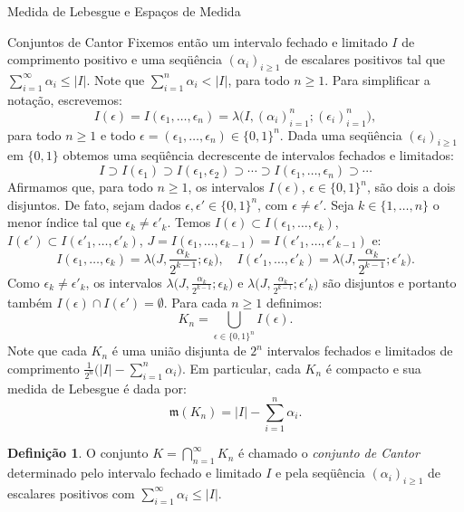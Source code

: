 \documentclass[oneside,final,11pt]{amsbook}
\newcommand{\leb}{\mathfrak m}
\theoremstyle{remark}\newtheorem{exercise}{Exercício}[chapter]
\theoremstyle{remark}\newtheorem{*exercise}[exercise]{\hbox to 0pt{\hskip 0pt minus 1fil*}Exercício}
\theoremstyle{definition}\newtheorem{exdefin}{Definição}[chapter]
\theoremstyle{plain}\newtheorem{teo}{Teorema}[section]
\theoremstyle{plain}\newtheorem{lem}[teo]{Lema}
\theoremstyle{plain}\newtheorem{prop}[teo]{Proposição}
\theoremstyle{plain}\newtheorem{cor}[teo]{Corolário}
\theoremstyle{definition}\newtheorem{defin}[teo]{Definição}
\theoremstyle{remark}\newtheorem{rem}[teo]{Observação}
\theoremstyle{definition}\newtheorem{notation}[teo]{Notação}
\theoremstyle{definition}\newtheorem{convention}[teo]{Convenção}
\theoremstyle{definition}\newtheorem{example}[teo]{Exemplo}
\numberwithin{section}{chapter}
\numberwithin{equation}{section}
\begin{document}
\begin{chapter}{Medida de Lebesgue e Espaços de Medida}
\begin{section}{Conjuntos de Cantor}
Fixemos então um intervalo fechado e limitado $I$ de comprimento positivo e uma seqüência
$(\alpha_i)_{i\ge1}$ de escalares positivos tal que $\sum_{i=1}^\infty\alpha_i\le\vert I\vert$.
Note que $\sum_{i=1}^n\alpha_i<\vert I\vert$, para todo $n\ge1$. Para simplificar a notação,
escrevemos:
\[I(\epsilon)=I(\epsilon_1,\ldots,\epsilon_n)=\lambda\big(I,(\alpha_i)_{i=1}^n;(\epsilon_i)_{i=1}^n\big),\]
para todo $n\ge1$ e todo $\epsilon=(\epsilon_1,\ldots,\epsilon_n)\in\{0,1\}^n$. Dada
uma seqüência $(\epsilon_i)_{i\ge1}$ em $\{0,1\}$ obtemos uma seqüência decrescente
de intervalos fechados e limitados:
\begin{equation}\label{eq:Iepsilondecr}
I\supset I(\epsilon_1)\supset I(\epsilon_1,\epsilon_2)\supset\cdots\supset I(\epsilon_1,\ldots,\epsilon_n)\supset\cdots
\end{equation}
Afirmamos que, para todo $n\ge1$, os intervalos $I(\epsilon)$, $\epsilon\in\{0,1\}^n$, são dois a dois disjuntos.
De fato, sejam dados $\epsilon,\epsilon'\in\{0,1\}^n$, com $\epsilon\ne\epsilon'$. Seja
$k\in\{1,\ldots,n\}$ o menor índice tal que $\epsilon_k\ne\epsilon'_k$. Temos
$I(\epsilon)\subset I(\epsilon_1,\ldots,\epsilon_k)$, $I(\epsilon')\subset I(\epsilon'_1,\ldots,\epsilon'_k)$,
$J=I(\epsilon_1,\ldots,\epsilon_{k-1})=I(\epsilon'_1,\ldots,\epsilon'_{k-1})$ e:
\[I(\epsilon_1,\ldots,\epsilon_k)=\lambda\Big(J,\frac{\alpha_k}{2^{k-1}};\epsilon_k\Big),\quad
I(\epsilon'_1,\ldots,\epsilon'_k)=\lambda\Big(J,\frac{\alpha_k}{2^{k-1}};\epsilon'_k\Big).\]
Como $\epsilon_k\ne\epsilon'_k$, os intervalos $\lambda\big(J,\frac{\alpha_k}{2^{k-1}};\epsilon_k\big)$
e $\lambda\big(J,\frac{\alpha_k}{2^{k-1}};\epsilon'_k\big)$ são disjuntos e portanto também
$I(\epsilon)\cap I(\epsilon')=\emptyset$. Para cada $n\ge1$ definimos:
\[K_n=\!\!\!\bigcup_{\epsilon\in\{0,1\}^n}\!\!I(\epsilon).\]
Note que cada $K_n$ é uma união disjunta de $2^n$ intervalos fechados e limitados
de comprimento $\frac1{2^n}\big(\vert I\vert-\sum_{i=1}^n\alpha_i\big)$. Em particular,
cada $K_n$ é compacto e sua medida de Lebesgue é dada por:
\begin{equation}\label{eq:medCantorn}
\leb(K_n)=\vert I\vert-\sum_{i=1}^n\alpha_i.
\end{equation}
\begin{defin}
O conjunto $K=\bigcap_{n=1}^\infty K_n$ é chamado o {\em conjunto de Cantor\/}
determinado pelo intervalo fechado e limitado $I$ e pela seqüência $(\alpha_i)_{i\ge1}$
de escalares positivos com $\sum_{i=1}^\infty\alpha_i\le\vert I\vert$.
\end{defin}


\end{section}
\end{chapter}
\end{document}
